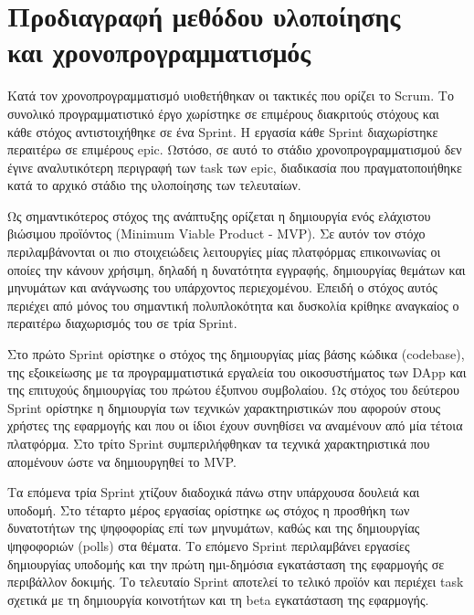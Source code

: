 \newpage
\setcounter{section}{8}
\setcounter{section}{7}
\section[Προδιαγραφή μεθόδου υλοποίησης και χρονοπρογραμματισμός]{Προδιαγραφή μεθόδου υλοποίησης \\και χρονοπρογραμματισμός}
\label{section:3-8-implementation-methodology-specification}

Κατά τον χρονοπρογραμματισμό υιοθετήθηκαν οι τακτικές που ορίζει το Scrum. Το συνολικό προγραμματιστικό έργο χωρίστηκε σε επιμέρους διακριτούς στόχους και κάθε στόχος αντιστοιχήθηκε σε ένα Sprint. Η εργασία κάθε Sprint διαχωρίστηκε περαιτέρω σε επιμέρους epic. Ωστόσο, σε αυτό το στάδιο χρονοπρογραμματισμού δεν έγινε αναλυτικότερη περιγραφή των task των epic, διαδικασία που πραγματοποιήθηκε κατά το αρχικό στάδιο της υλοποίησης των τελευταίων.

Ως σημαντικότερος στόχος της ανάπτυξης ορίζεται η δημιουργία ενός ελάχιστου βιώσιμου προϊόντος (Minimum Viable Product - MVP). Σε αυτόν τον στόχο περιλαμβάνονται οι πιο στοιχειώδεις λειτουργίες μίας πλατφόρμας επικοινωνίας οι οποίες την κάνουν χρήσιμη, δηλαδή η δυνατότητα εγγραφής, δημιουργίας θεμάτων και μηνυμάτων και ανάγνωσης του υπάρχοντος περιεχομένου. Επειδή ο στόχος αυτός περιέχει από μόνος του σημαντική πολυπλοκότητα και δυσκολία κρίθηκε αναγκαίος ο περαιτέρω διαχωρισμός του σε τρία Sprint.

Στο πρώτο Sprint ορίστηκε ο στόχος της δημιουργίας μίας βάσης κώδικα (codebase), της εξοικείωσης με τα προγραμματιστικά εργαλεία του οικοσυστήματος των DApp και της επιτυχούς δημιουργίας του πρώτου έξυπνου συμβολαίου. Ως στόχος του δεύτερου Sprint ορίστηκε η δημιουργία των τεχνικών χαρακτηριστικών που αφορούν στους χρήστες της εφαρμογής και που οι ίδιοι έχουν συνηθίσει να αναμένουν από μία τέτοια πλατφόρμα. Στο τρίτο Sprint συμπεριλήφθηκαν τα τεχνικά χαρακτηριστικά που απομένουν ώστε να δημιουργηθεί το MVP.

Τα επόμενα τρία Sprint χτίζουν διαδοχικά πάνω στην υπάρχουσα δουλειά και υποδομή. Στο τέταρτο μέρος εργασίας ορίστηκε ως στόχος η προσθήκη των δυνατοτήτων της ψηφοφορίας επί των μηνυμάτων, καθώς και της δημιουργίας ψηφοφοριών (polls) στα θέματα. Το επόμενο Sprint περιλαμβάνει εργασίες δημιουργίας υποδομής και την πρώτη ημι-δημόσια εγκατάσταση της εφαρμογής σε περιβάλλον δοκιμής. Το τελευταίο Sprint αποτελεί το τελικό προϊόν και περιέχει task σχετικά με τη δημιουργία κοινοτήτων και τη beta εγκατάσταση της εφαρμογής.


